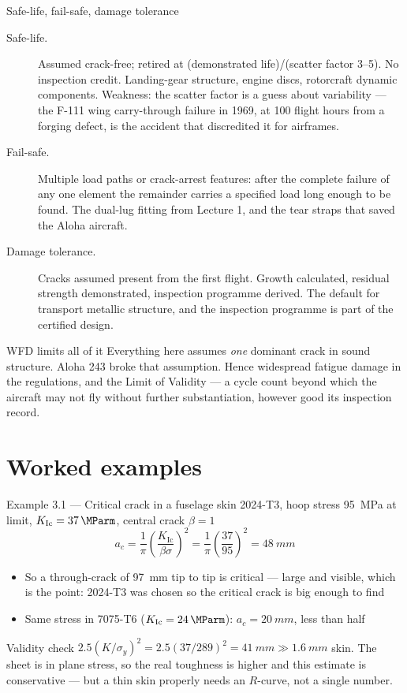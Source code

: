 \documentclass[aspectratio=169,10pt]{beamer}
\begin{document}
\begin{frame}{Safe-life, fail-safe, damage tolerance}
\footnotesize
\begin{description}
  \item[Safe-life.] Assumed crack-free; retired at (demonstrated life)/(scatter factor 3--5). No inspection credit. Landing-gear structure, engine discs, rotorcraft dynamic components. \alert{Weakness:} the scatter factor is a guess about variability --- the F-111 wing carry-through failure in 1969, at 100 flight hours from a forging defect, is the accident that discredited it for airframes.
  \item[Fail-safe.] Multiple load paths or crack-arrest features: after the complete failure of any one element the remainder carries a specified load long enough to be found. The dual-lug fitting from Lecture 1, and the tear straps that saved the Aloha aircraft.
  \item[Damage tolerance.] Cracks assumed present from the first flight. Growth calculated, residual strength demonstrated, inspection programme derived. \alert{The default for transport metallic structure}, and the inspection programme is part of the certified design.
\end{description}
\begin{alertblock}{WFD limits all of it}
\footnotesize Everything here assumes \emph{one} dominant crack in sound structure. Aloha 243 broke that assumption. Hence widespread fatigue damage in the regulations, and the \alert{Limit of Validity} --- a cycle count beyond which the aircraft may not fly without further substantiation, however good its inspection record.
\end{alertblock}
\end{frame}

\section{Worked examples}

\begin{frame}{Example 3.1 --- Critical crack in a fuselage skin}
2024-T3, hoop stress \SI{95}{MPa} at limit, $K_{\mathrm{Ic}}=\SI{37}{\MParm}$, central crack $\beta=1$
\[
a_c=\frac{1}{\pi}\left(\frac{K_{\mathrm{Ic}}}{\beta\sigma}\right)^{2}
=\frac{1}{\pi}\left(\frac{37}{95}\right)^{2}=\SI{48}{mm}
\]
\begin{itemize}
  \item So a through-crack of \SI{97}{mm} tip to tip is critical --- \alert{large and visible}, which is the point: 2024-T3 was chosen so the critical crack is big enough to find
  \item Same stress in 7075-T6 ($K_{\mathrm{Ic}}=\SI{24}{\MParm}$): $a_c=\SI{20}{mm}$, less than half
\end{itemize}
\begin{block}{Validity check}
$2.5(K/\sigma_y)^2=2.5(37/289)^2=\SI{41}{mm}\gg\SI{1.6}{mm}$ skin. The sheet is in \alert{plane stress}, so the real toughness is higher and this estimate is conservative --- but a thin skin properly needs an $R$-curve, not a single number.
\end{block}
\end{frame}
\end{document}
